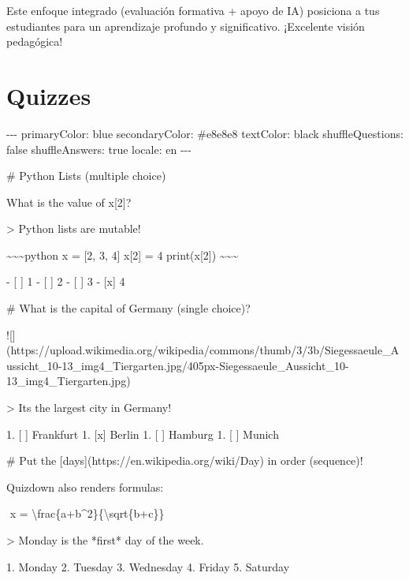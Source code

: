 \documentclass[
  spanish,
  12pt,
  letterpaper,
  DIV=11,
  numbers=noendperiod]{scrreprt}
\newenvironment{Shaded}{\begin{snugshade}}{\end{snugshade}}
\newcommand{\NormalTok}[1]{\textcolor[rgb]{0.00,0.23,0.31}{#1}}
\begin{document}
Este enfoque integrado (evaluación formativa + apoyo de IA) posiciona a
tus estudiantes para un aprendizaje profundo y significativo. ¡Excelente
visión pedagógica! 💪

\chapter{Quizzes}\label{quizzes}

\begin{Shaded}
\begin{Highlighting}[]
\NormalTok{{-}{-}{-}}
\NormalTok{primaryColor: blue}
\NormalTok{secondaryColor: \textquotesingle{}\#e8e8e8\textquotesingle{}}
\NormalTok{textColor: black}
\NormalTok{shuffleQuestions: false}
\NormalTok{shuffleAnswers: true}
\NormalTok{locale: en}
\NormalTok{{-}{-}{-}}

\NormalTok{\# Python Lists (multiple choice)}

\NormalTok{What is the value of \textasciigrave{}x[2]\textasciigrave{}?}

\NormalTok{\textgreater{} Python lists are mutable!}

\NormalTok{\textasciitilde{}\textasciitilde{}\textasciitilde{}python}
\NormalTok{x = [2, 3, 4]}
\NormalTok{x[2] = 4}
\NormalTok{print(x[2])}
\NormalTok{\textasciitilde{}\textasciitilde{}\textasciitilde{}}

\NormalTok{{-} [ ] 1}
\NormalTok{{-} [ ] 2}
\NormalTok{{-} [ ] 3}
\NormalTok{{-} [x] 4}

\NormalTok{\# What is the capital of Germany (single choice)? }

\NormalTok{![](https://upload.wikimedia.org/wikipedia/commons/thumb/3/3b/Siegessaeule\_Aussicht\_10{-}13\_img4\_Tiergarten.jpg/405px{-}Siegessaeule\_Aussicht\_10{-}13\_img4\_Tiergarten.jpg)}

\NormalTok{\textgreater{} It\textquotesingle{}s the largest city in Germany!         }

\NormalTok{1. [ ] Frankfurt}
\NormalTok{1. [x] Berlin}
\NormalTok{1. [ ] Hamburg}
\NormalTok{1. [ ] Munich}


\NormalTok{\# Put the [days](https://en.wikipedia.org/wiki/Day) in order (sequence)!}

\NormalTok{Quizdown also renders formulas:}

\NormalTok{$$}
\NormalTok{x = \textbackslash{}frac\{a+b\^{}2\}\{\textbackslash{}sqrt\{b+c\}\}}
\NormalTok{$$}

\NormalTok{\textgreater{} Monday is the *first* day of the week.}

\NormalTok{1. Monday}
\NormalTok{2. Tuesday}
\NormalTok{3. Wednesday}
\NormalTok{4. Friday}
\NormalTok{5. Saturday}
\end{Highlighting}
\end{Shaded}
\end{document}

